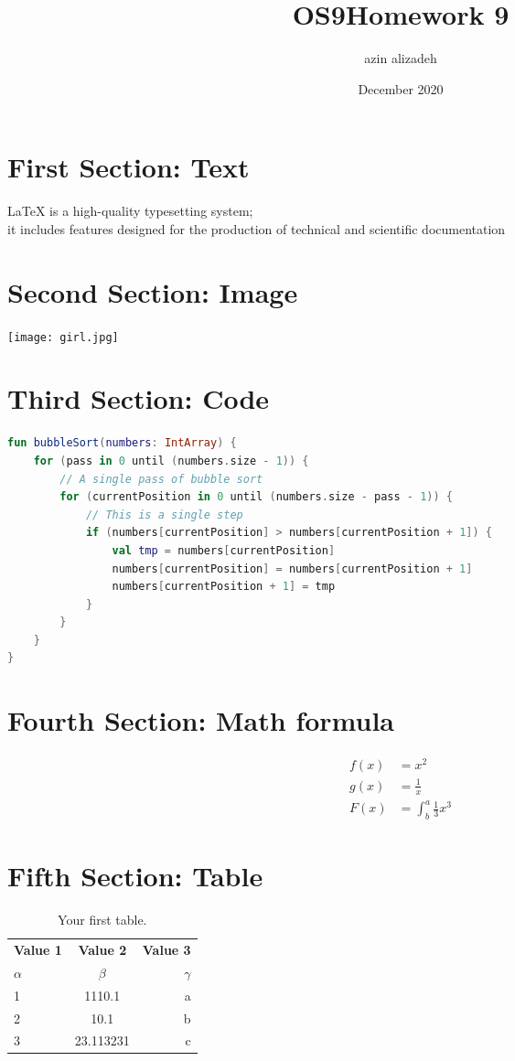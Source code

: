 \documentclass{article}
\title{OS9}
\author{azin alizadeh }
\date{December 2020}
\begin{document}
\title{Homework 9}
\maketitle

\section{First Section: Text}
LaTeX is a high-quality typesetting system;\\
it includes features designed for the production of technical and scientific documentation\\

\section{Second Section: Image}
  \texttt{[image: girl.jpg]}
  
\section{Third Section: Code}
\begin{lstlisting}[language=kotlin]
fun bubbleSort(numbers: IntArray) {
    for (pass in 0 until (numbers.size - 1)) {
        // A single pass of bubble sort
        for (currentPosition in 0 until (numbers.size - pass - 1)) {
            // This is a single step
            if (numbers[currentPosition] > numbers[currentPosition + 1]) {
                val tmp = numbers[currentPosition]
                numbers[currentPosition] = numbers[currentPosition + 1]
                numbers[currentPosition + 1] = tmp
            }
        }
    }
}
\end{lstlisting}
 
\section{Fourth Section: Math formula}
\begin{align*}
  f(x) &= x^2\\
  g(x) &= \frac{1}{x}\\
  F(x) &= \int^a_b \frac{1}{3}x^3
\end{align*}

\section{Fifth Section: Table}
\begin{table}[h!]
  \begin{center}
    \caption{Your first table.}
    \label{tab:table1}
    \begin{tabular}{l|c|r}
      \textbf{Value 1} & \textbf{Value 2} & \textbf{Value 3}\\
      $\alpha$ & $\beta$ & $\gamma$ \\
      \hline
      1 & 1110.1 & a\\
      2 & 10.1 & b\\
      3 & 23.113231 & c\\
    \end{tabular}
  \end{center}
\end{table}
 
 
\end{document}
